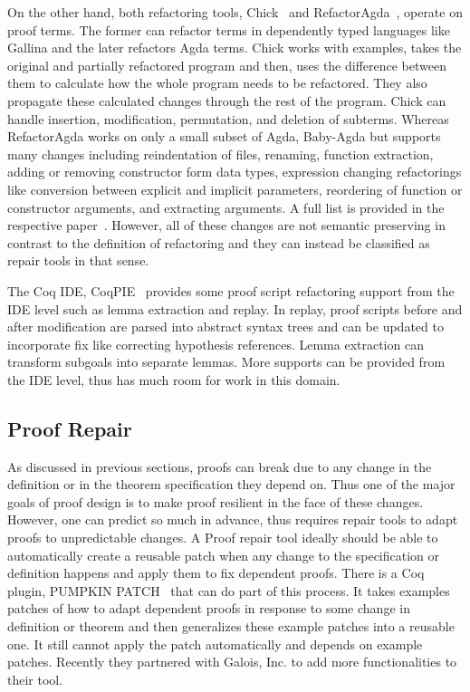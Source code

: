 On the other hand, both refactoring tools, Chick~\cite{Robert_2018} and RefactorAgda~\cite{Wibergh_2019}, operate on proof terms. The former can refactor terms in dependently typed languages like Gallina and the later refactors Agda terms. Chick works with examples, takes the original and partially refactored program and then, uses the difference between them to calculate how the whole program needs to be refactored. They also propagate these calculated changes through the rest of the program. Chick can handle insertion, modification, permutation, and deletion of subterms. Whereas RefactorAgda works on only a small subset of Agda, Baby-Agda but supports many changes including reindentation of files, renaming, function extraction, adding or removing constructor form data types, expression changing refactorings like conversion between explicit and implicit parameters, reordering of function or constructor arguments, and extracting arguments. A full list is provided in the respective paper~\cite{Wibergh_2019}. However, all of these changes are not semantic preserving in contrast to the definition of refactoring and they can instead be classified as repair tools in that sense. 


The Coq IDE, CoqPIE~\cite{Roe_Smith_2016} provides some proof script refactoring support from the IDE level such as lemma extraction and replay. In replay, proof scripts before and after modification are parsed into abstract syntax trees and can be updated to incorporate fix like correcting hypothesis references. Lemma extraction can transform subgoals into separate lemmas. More supports can be provided from the IDE level, thus has much room for work in this domain. 

\subsection{Proof Repair} As discussed in previous sections, proofs can break due to any change in the definition or in the theorem specification they depend on. Thus one of the major goals of proof design is to make proof resilient in the face of these changes. However, one can predict so much in advance, thus requires repair tools to adapt proofs to unpredictable changes. A Proof repair tool ideally should be able to automatically create a reusable patch when any change to the specification or definition happens and apply them to fix dependent proofs. There is a Coq plugin, PUMPKIN PATCH~\cite{Ringer_et_al_2018} that can do part of this process. It takes examples patches of how to adapt dependent proofs in response to some change in definition or theorem and then generalizes these example patches into a reusable one. It still cannot apply the patch automatically and depends on example patches. Recently they partnered with Galois, Inc. to add more functionalities to their tool. 


